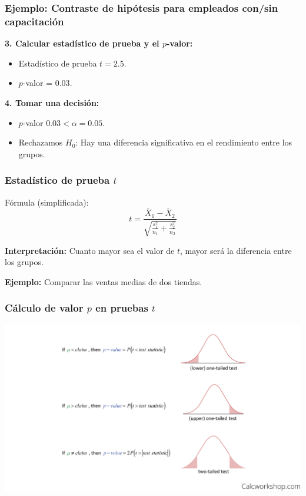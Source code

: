 \documentclass[aspectratio=169]{beamer}
\begin{document}
    \begin{frame}
    \frametitle{Ejemplo: Contraste de hipótesis para empleados con/sin capacitación}
    \textbf{3. Calcular estadístico de prueba y el \(p\)-valor:}
    \begin{itemize}
        \item Estadístico de prueba \(t = 2.5\).
        \item \(p\)-valor = \(0.03\).
    \end{itemize}
    
    \textbf{4. Tomar una decisión:}
    \begin{itemize}
        \item \(p\)-valor \(0.03 < \alpha = 0.05\).
        \item Rechazamos \(H_0\): Hay una diferencia significativa en el rendimiento entre los grupos.
    \end{itemize}
\end{frame}





\begin{frame}
    \frametitle{Estadístico de prueba $t$}
    Fórmula (simplificada):
    \[
    t = \frac{\bar{X}_1 - \bar{X}_2}{\sqrt{\frac{s_1^2}{n_1} + \frac{s_2^2}{n_2}}}
    \]

\vfill

    \textbf{Interpretación:} Cuanto mayor sea el valor de \(t\), mayor será la diferencia entre los grupos.

\vfill
    
    \textbf{Ejemplo:} Comparar las ventas medias de dos tiendas.

\end{frame}

\begin{frame}
\frametitle{Cálculo de valor $p$ en pruebas $t$}
\begin{center}
\includegraphics[width=0.8\linewidth]{Figuras/how-to-find-p-value.png} %
\end{center}
\end{frame}
\end{document}
